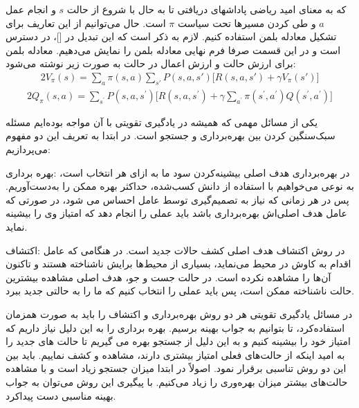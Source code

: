 که به معنای امید ریاضی پاداشهای دریافتی تا به حال با شروع از حالت $s$ و انجام عمل $a$ و طی کردن مسیرها تحت سیاست $\pi$ است. حال می‌توانیم از این تعاریف برای تشکیل معادله بلمن استفاده کنیم. لازم به ذکر است که این تبدیل در []، در دسترس است و در این قسمت صرفا فرم نهایی معادله بلمن را نمایش می‌دهیم. معادله بلمن برای ارزش حالت و ارزش اعمال در حالت به صورت زیر نوشته می‌شود:
\begin{alignat}{2}
	V_\pi(s) = \sum\limits_a \pi(s,a) \sum\limits_{s\prime}  P(s,a,s\prime) \big[ R(s,a,s\prime) + \gamma V_\pi(s\prime)\big]
	\label{1002}  
\end{alignat}  
\begin{alignat}{2}
	Q_\pi(s,a) = \sum\limits_{s^\prime} P(s,a,s^\prime) \bigg[ R(s,a,s^\prime) + \gamma \sum\limits_{a^\prime} \pi (s^\prime , a^\prime) Q(s^\prime, a^\prime) \bigg]
	\label{1003}  
\end{alignat}  


یکی از مسائل مهمی که همیشه در یادگیری تقویتی با آن مواجه بوده‌ایم مسئله سبک‌سنگین کردن بین بهره‌برداری  و جستجو است. در ابتدا به تعریف این دو مفهوم می‌پردازیم:



 $\textbf{بهره برداری:}$
در بهره‌برداری هدف اصلی بیشینه‌کردن سود ما به ازای هر انتخاب است، به نوعی می‌خواهیم با استفاده از دانش کسب‌شده، حداکثر بهره ممکن را به‌دست‌آوریم. پس در هر زمانی که نیاز به تصمیم‌گیری توسط عامل احساس می شود، در صورتی که عامل هدف اصلی‌اش بهره‌برداری باشد باید عملی را انجام دهد که امتیاز وی را بیشینه نماید.

 $\textbf{اکتشاف:}$ 
در روش اکتشاف هدف اصلی کشف حالات جدید است. در هنگامی که عامل اقدام به کاوش در محیط می‌نماید، بسیاری از محیط‌ها برایش ناشناخته هستند و تاکنون آن‌ها را مشاهده نکرده است. در حالت جست و جو، هدف اصلی مشاهده بیشترین حالت ناشناخته ممکن است، پس باید عملی را انتخاب کنیم که ما را به حالتی جدید ببرد.

در مسائل یادگیری تقویتی هر دو روش بهره‌برداری و اکتشاف را باید به صورت همزمان استفاده‌کرد، تا بتوانیم به جواب بهینه برسیم. بهره برداری را به این دلیل نیاز داریم که امتیاز خود را بیشینه کنیم و به این دلیل از جستجو بهره می گیریم تا حالت های جدید را به امید اینکه از حالت‌های فعلی امتیاز بیشتری دارند، مشاهده و کشف نماییم. باید بین این دو روش تناسبی برقرار نمود. اصولاً در ابتدا میزان جستجو زیاد است و با مشاهده حالت‌های بیشتر میزان بهره‌وری را زیاد می‌کنیم. با پیگیری این روش می‌توان به جواب بهینه مناسبی دست پیدا‌کرد.

